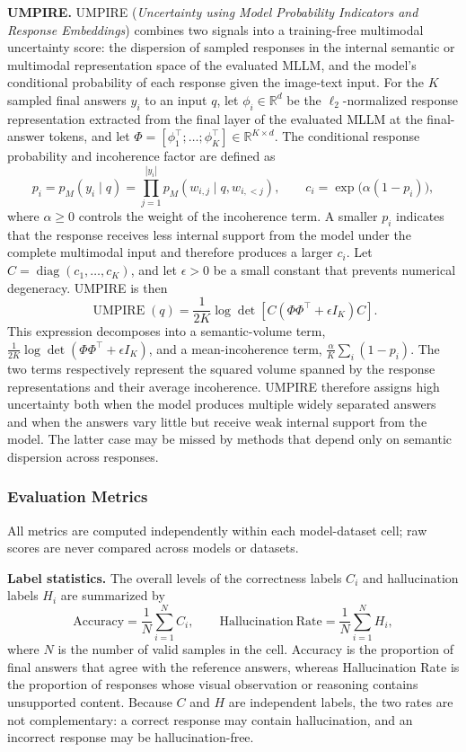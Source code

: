 \textbf{UMPIRE.} UMPIRE (\textit{Uncertainty using Model Probability Indicators and Response Embeddings}) combines two signals into a training-free multimodal uncertainty score: the dispersion of sampled responses in the internal semantic or multimodal representation space of the evaluated MLLM, and the model's conditional probability of each response given the image-text input. For the $K$ sampled final answers $y_i$ to an input $q$, let $\phi_i\in\mathbb{R}^d$ be the $\ell_2$-normalized response representation extracted from the final layer of the evaluated MLLM at the final-answer tokens, and let $\Phi=[\phi_1^\top;\ldots;\phi_K^\top]\in\mathbb{R}^{K\times d}$. The conditional response probability and incoherence factor are defined as
\[
p_i=p_M(y_i\mid q)=\prod_{j=1}^{|y_i|}p_M(w_{i,j}\mid q,w_{i,<j}),
\qquad
c_i=\exp\!\bigl(\alpha(1-p_i)\bigr),
\]
where $\alpha\geq0$ controls the weight of the incoherence term. A smaller $p_i$ indicates that the response receives less internal support from the model under the complete multimodal input and therefore produces a larger $c_i$. Let $C=\operatorname{diag}(c_1,\ldots,c_K)$, and let $\epsilon>0$ be a small constant that prevents numerical degeneracy. UMPIRE is then
\[
\operatorname{UMPIRE}(q)=\frac{1}{2K}\log\det\!\left[C\left(\Phi\Phi^\top+\epsilon I_K\right)C\right].
\]
This expression decomposes into a semantic-volume term, $\frac{1}{2K}\log\det(\Phi\Phi^\top+\epsilon I_K)$, and a mean-incoherence term, $\frac{\alpha}{K}\sum_i(1-p_i)$. The two terms respectively represent the squared volume spanned by the response representations and their average incoherence. UMPIRE therefore assigns high uncertainty both when the model produces multiple widely separated answers and when the answers vary little but receive weak internal support from the model. The latter case may be missed by methods that depend only on semantic dispersion across responses.

\subsubsection{Evaluation Metrics}
\label{subsubsec:evaluation_metrics}

All metrics are computed independently within each model-dataset cell; raw scores are never compared across models or datasets.

\textbf{Label statistics.} The overall levels of the correctness labels $C_i$ and hallucination labels $H_i$ are summarized by
\[
\mathrm{Accuracy}=\frac{1}{N}\sum_{i=1}^{N}C_i,
\qquad
\mathrm{Hallucination\ Rate}=\frac{1}{N}\sum_{i=1}^{N}H_i,
\]
where $N$ is the number of valid samples in the cell. Accuracy is the proportion of final answers that agree with the reference answers, whereas Hallucination Rate is the proportion of responses whose visual observation or reasoning contains unsupported content. Because $C$ and $H$ are independent labels, the two rates are not complementary: a correct response may contain hallucination, and an incorrect response may be hallucination-free.

